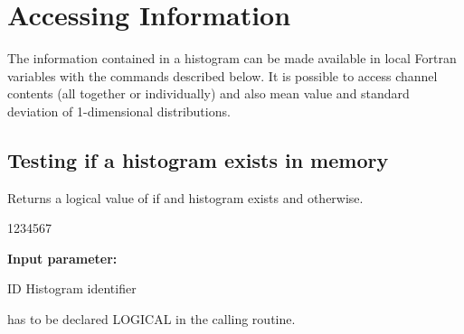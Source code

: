  
\chapter{Accessing Information}
\label{HACCINFO}
 
The information contained in a histogram can be made available in
%
%
%
%
%
local Fortran variables with the commands described below.
It is possible
to access channel contents (all together or individually) and also
mean
value and standard deviation of 1-dimensional distributions.
 
\section{Testing if a histogram exists in memory}
\label{HISEXIST}
 
 
\Action
Returns a logical value of  if and histogram exists
and  otherwise.
 
\begin{DLtt}{1234567}
\item[{\rm\bf Input parameter:}]
\item[ID] Histogram identifier
\end{DLtt}
 
\Remark
{} has to be declared LOGICAL in the calling routine.
 
\label{HISTLIST}
 
